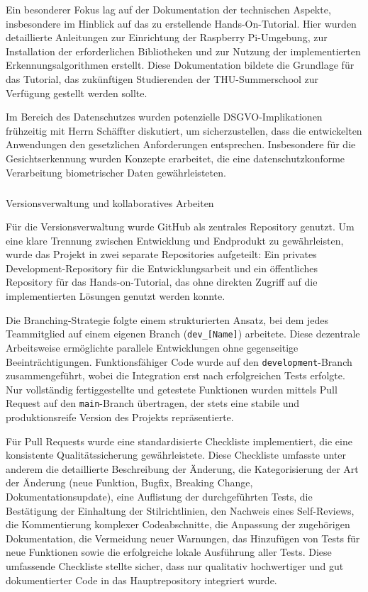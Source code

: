 Ein besonderer Fokus lag auf der Dokumentation der technischen Aspekte, insbesondere im Hinblick auf das zu erstellende Hands-On-Tutorial. Hier wurden detaillierte Anleitungen zur Einrichtung der Raspberry Pi-Umgebung, zur Installation der erforderlichen Bibliotheken und zur Nutzung der implementierten Erkennungsalgorithmen erstellt. Diese Dokumentation bildete die Grundlage für das Tutorial, das zukünftigen Studierenden der THU-Summerschool zur Verfügung gestellt werden sollte.

Im Bereich des Datenschutzes wurden potenzielle DSGVO-Implikationen frühzeitig mit Herrn Schäffter diskutiert, um sicherzustellen, dass die entwickelten Anwendungen den gesetzlichen Anforderungen entsprechen. Insbesondere für die Gesichtserkennung wurden Konzepte erarbeitet, die eine datenschutzkonforme Verarbeitung biometrischer Daten gewährleisteten.

\subparagraph{}{Versionsverwaltung und kollaboratives Arbeiten}

Für die Versionsverwaltung wurde GitHub als zentrales Repository genutzt. Um eine klare Trennung zwischen Entwicklung und Endprodukt zu gewährleisten, wurde das Projekt in zwei separate Repositories aufgeteilt: Ein privates Development-Repository für die Entwicklungsarbeit und ein öffentliches Repository für das Hands-on-Tutorial, das ohne direkten Zugriff auf die implementierten Lösungen genutzt werden konnte.

Die Branching-Strategie folgte einem strukturierten Ansatz, bei dem jedes Teammitglied auf einem eigenen Branch (\texttt{dev\_[Name]}) arbeitete. Diese dezentrale Arbeitsweise ermöglichte parallele Entwicklungen ohne gegenseitige Beeinträchtigungen. Funktionsfähiger Code wurde auf den \texttt{development}-Branch zusammengeführt, wobei die Integration erst nach erfolgreichen Tests erfolgte. Nur vollständig fertiggestellte und getestete Funktionen wurden mittels Pull Request auf den \texttt{main}-Branch übertragen, der stets eine stabile und produktionsreife Version des Projekts repräsentierte.

Für Pull Requests wurde eine standardisierte Checkliste implementiert, die eine konsistente Qualitätssicherung gewährleistete. Diese Checkliste umfasste unter anderem die detaillierte Beschreibung der Änderung, die Kategorisierung der Art der Änderung (neue Funktion, Bugfix, Breaking Change, Dokumentationsupdate), eine Auflistung der durchgeführten Tests, die Bestätigung der Einhaltung der Stilrichtlinien, den Nachweis eines Self-Reviews, die Kommentierung komplexer Codeabschnitte, die Anpassung der zugehörigen Dokumentation, die Vermeidung neuer Warnungen, das Hinzufügen von Tests für neue Funktionen sowie die erfolgreiche lokale Ausführung aller Tests. Diese umfassende Checkliste stellte sicher, dass nur qualitativ hochwertiger und gut dokumentierter Code in das Hauptrepository integriert wurde.

